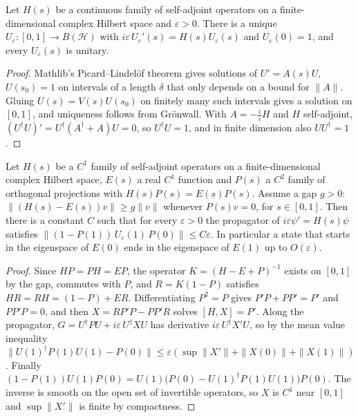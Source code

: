 \begin{theorem}\label{thm:propagator}
  \leanok
    Let $H(s)$ be a continuous family of self-adjoint operators on a finite-dimensional complex Hilbert space and
  $\varepsilon>0$. There is a unique $U_\varepsilon\colon[0,1]\to B(\mathcal H)$ with $i\varepsilon\,U_\varepsilon'(s)=H(s)U_\varepsilon(s)$ and
  $U_\varepsilon(0)=1$, and every $U_\varepsilon(s)$ is unitary.
\end{theorem}
\begin{proof}\leanok
  Mathlib's Picard--Lindel\"of theorem gives solutions of $U'=A(s)U$, $U(s_0)=1$ on intervals of a length $\delta$ that only
  depends on a bound for $\|A\|$. Gluing $U(s)=V(s)U(s_0)$ on finitely many such intervals gives a solution on $[0,1]$, and
  uniqueness follows from Gr\"onwall. With $A=-\tfrac i\varepsilon H$ and $H$ self-adjoint, $(U^\dagger U)'=U^\dagger(A^\dagger+A)U=0$,
  so $U^\dagger U=1$, and in finite dimension also $UU^\dagger=1$.
\end{proof}

\begin{theorem}\label{thm:adiabatic}
  \leanok
    Let $H(s)$ be a $C^1$ family of self-adjoint operators on a finite-dimensional complex Hilbert space, $E(s)$ a real
  $C^1$ function and $P(s)$ a $C^2$ family of orthogonal projections with $H(s)P(s)=E(s)P(s)$. Assume a gap $g>0$:
  $\|(H(s)-E(s))v\|\ge g\|v\|$ whenever $P(s)v=0$, for $s\in[0,1]$. Then there is a constant $C$ such that for every
  $\varepsilon>0$ the propagator of $i\varepsilon\psi'=H(s)\psi$ satisfies $\|(1-P(1))\,U_\varepsilon(1)\,P(0)\|\le C\varepsilon$. In
  particular a state that starts in the eigenspace of $E(0)$ ends in the eigenspace of $E(1)$ up to $O(\varepsilon)$.
\end{theorem}
\begin{proof}\leanok
  Since $HP=PH=EP$, the operator $K=(H-E+P)^{-1}$ exists on $[0,1]$ by the gap, commutes with $P$, and $R=K(1-P)$ satisfies
  $HR=RH=(1-P)+ER$. Differentiating $P^2=P$ gives $P'P+PP'=P'$ and $PP'P=0$, and then $X=RP'P-PP'R$ solves
  $[H,X]=P'$. Along the propagator, $G=U^\dagger PU+i\varepsilon\,U^\dagger XU$ has derivative $i\varepsilon\,U^\dagger X'U$, so by the
  mean value inequality $\|U(1)^\dagger P(1)U(1)-P(0)\|\le\varepsilon(\sup\|X'\|+\|X(0)\|+\|X(1)\|)$. Finally
  $(1-P(1))U(1)P(0)=U(1)\bigl(P(0)-U(1)^\dagger P(1)U(1)\bigr)P(0)$. The inverse is smooth on the open set of invertible
  operators, so $X$ is $C^1$ near $[0,1]$ and $\sup\|X'\|$ is finite by compactness.
\end{proof}

